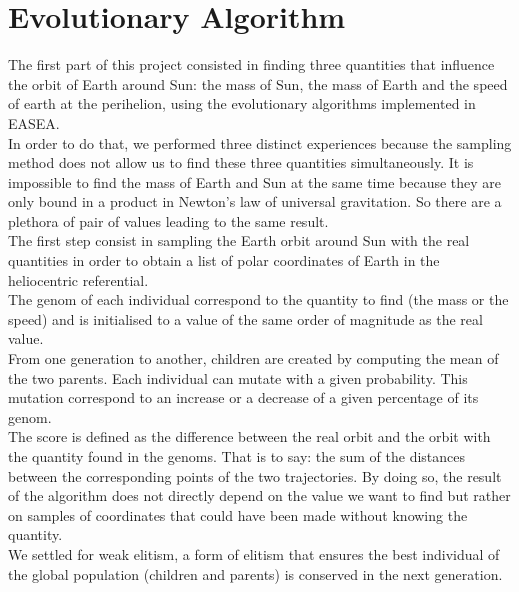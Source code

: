 \section{Evolutionary Algorithm}
The first part of this project consisted in finding three quantities that influence the orbit of Earth around Sun: the mass of Sun, the mass of Earth and the speed of earth at the perihelion, using the evolutionary algorithms implemented in EASEA.\\
In order to do that, we performed three distinct experiences because the sampling method does not allow us to find these three quantities simultaneously. It is impossible to find the mass of Earth and Sun at the same time because they are only bound in a product in Newton's law of universal gravitation. So there are a plethora of pair of values leading to the same result.\\
The first step consist in sampling the Earth orbit around Sun with the real quantities in order to obtain a list of polar coordinates of Earth in the heliocentric referential.\\
The genom of each individual correspond to the quantity to find (the mass or the speed) and is initialised to a value of the same order of magnitude as the real value.\\
From one generation to another, children are created by computing the mean of the two parents. Each individual can mutate with a given probability. This mutation correspond to an increase or a decrease of a given percentage of its genom.\\
The score is defined as the difference between the real orbit and the orbit with the quantity found in the genoms. That is to say: the sum of the distances between the corresponding points of the two trajectories. By doing so, the result of the algorithm does not directly depend on the value we want to find but rather on samples of coordinates that could have been made without knowing the quantity.\\
We settled for weak elitism, a form of elitism that ensures the best individual of the global population (children and parents) is conserved in the next generation.


